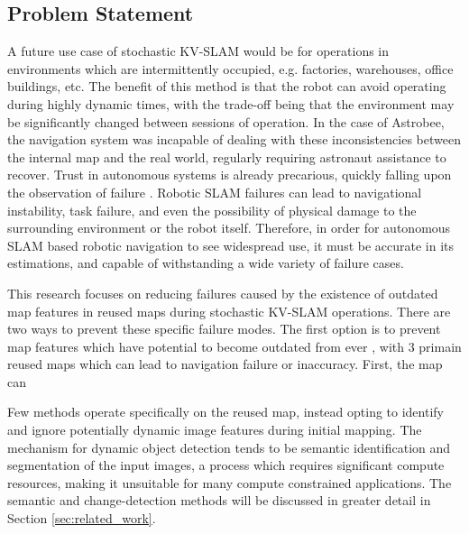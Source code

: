 \subsection{Problem Statement}

A future use case of stochastic KV-SLAM would be for operations in environments which are intermittently occupied, e.g. factories, warehouses, office buildings, etc. The benefit of this method is that the robot can avoid operating during highly dynamic times, with the trade-off being that the environment may be significantly changed between sessions of operation. In the case of Astrobee, the navigation system was incapable of dealing with these inconsistencies between the internal map and the real world, regularly requiring astronaut assistance to recover. Trust in autonomous systems is already precarious, quickly falling upon the observation of failure \cite{robinetteEffectRobotPerformance2017}. Robotic SLAM failures can lead to navigational instability, task failure, and even the possibility of physical damage to the surrounding environment or the robot itself\cite{nahavandiComprehensiveReviewAutonomous2025a}. Therefore, in order for autonomous SLAM based robotic navigation to see widespread use, it must be accurate in its estimations, and capable of withstanding a wide variety of failure cases.

This research focuses on reducing failures caused by the existence of outdated map features in reused maps during stochastic KV-SLAM operations. There are two ways to prevent these specific failure modes. The first option is to prevent map features which have potential to become outdated from ever , with 3 primain reused maps which can lead to navigation failure or inaccuracy. First, the map can 

Few methods operate specifically on the reused map, instead opting to identify and ignore potentially dynamic image features during initial mapping. The mechanism for dynamic object detection tends to be semantic identification and segmentation of the input images, a process which requires significant compute resources, making it unsuitable for many compute constrained applications. The semantic and change-detection methods will be discussed in greater detail in Section \ref{sec:related_work}.

